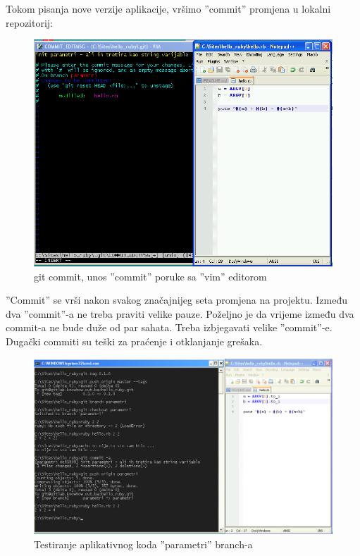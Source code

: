 \documentclass[times, utf8, seminar]{fit}
\begin{document}
Tokom pisanja nove verzije aplikacije, vršimo ''commit'' promjena u lokalni repozitorij:

\begin{figure}[H]
\centering
\includegraphics[width=15cm]{img/gitlab_new_branch_commit_with_vim}
\caption{git commit, unos ''commit'' poruke sa ''vim'' editorom}
\end{figure}

''Commit'' se vrši nakon svakog značajnijeg seta promjena na projektu.  Između dva ''commit''-a ne treba praviti velike pauze. Poželjno je da vrijeme između dva commit-a ne bude duže od par sahata. Treba izbjegavati velike ''commit''-e. Dugački commiti su teški za praćenje i otklanjanje grešaka.

\begin{figure}[H]
\centering
\includegraphics[width=15cm]{img/gitlab_new_branch_3.png}
\caption{Testiranje aplikativnog koda ''parametri'' branch-a}
\end{figure}
\end{document}
